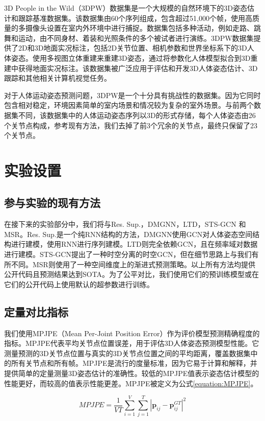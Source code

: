 3D People in the Wild（3DPW）数据集是一个大规模的自然环境下的3D姿态估计和跟踪基准数据集。该数据集由60个序列组成，包含超过51,000个帧，使用高质量的多摄像头设置在室内外环境中进行捕捉。数据集包括多种活动，例如走路、跳舞和运动，由不同身材、着装和光照条件的多个被试者进行演练。3DPW数据集提供了2D和3D地面实况标注，包括2D关节位置、相机参数和世界坐标系下的3D人体姿态。使用多视图立体重建来重建3D姿态，通过将参数化人体模型拟合到3D重建中获得地面实况标注。该数据集被广泛应用于评估和开发3D人体姿态估计、3D跟踪和其他相关计算机视觉任务。

对于人体运动姿态预测问题，3DPW是一个十分具有挑战性的数据集。因为它同时包含相对稳定，环境因素简单的室内场景和情况较为复杂的室外场景。与前两个数据集不同，该数据集中的人体运动姿态序列以3D的形式存储，每个人体姿态由26个关节点构成，参考现有方法，我们去掉了前3个冗余的关节点，最终只保留了23个关节点。

\section{实验设置}
\subsection{参与实验的现有方法}
在接下来的实验部分中，我们将与Res. Sup.\parencite{martinez2017human}，DMGNN\parencite{li2020dynamic}，LTD\parencite{mao2019learning}，STS-GCN\parencite{sofianos2021space} 和 MSR\parencite{dang2021msr}。Res. Sup.是一个纯RNN结构的方法，DMGNN使用GCN对人体姿态空间结构进行建模，使用RNN进行序列建模。LTD则完全依赖GCN，且在频率域对数据进行建模。STS-GCN提出了一种时空分离的时空GCN，但在细节思路上与我们有所不同。MSR则使用了一种空间维度上的渐进式预测策略。以上所有方法均提供公开代码且预测结果达到SOTA。为了公平对比，我们使用它们的预训练模型或在它们的公开代码上使用默认的超参数进行训练。
\subsection{定量对比指标}
我们使用MPJPE（Mean Per-Joint Position Error）作为评价模型预测精确程度的指标。MPJPE代表平均关节点位置误差，用于评估3D人体姿态预测模型性能。它测量预测的3D关节点位置与真实的3D关节点位置之间的平均距离，覆盖数据集中的所有关节点和所有帧。MPJPE是流行的度量标准，因为它易于计算和解释，并提供简单的定量测量3D姿态估计的准确性。较低的MPJPE值表示姿态估计模型的性能更好，而较高的值表示性能更差。MPJPE被定义为公式\ref{equation:MPJPE}。

\begin{equation}
    MPJPE = \frac{1}{VT}\sum_{i=1}^{V}\sum_{j=1}^{T} | \mathbf{p}_{ij} - \mathbf{p}^{GT}_{ij} |^2
    \label{equation:MPJPE}
\end{equation}

